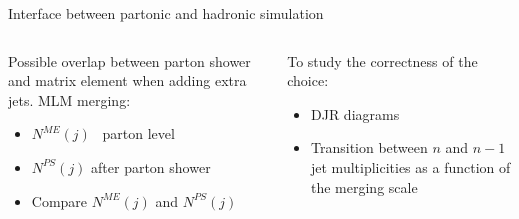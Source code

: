 \begin{frame}{Interface between partonic and hadronic simulation}
\vspace{-.2cm}
\begin{columns}
\begin{column}{.50\textwidth}
  \begin{block}{}\tiny
    Possible overlap between parton shower and matrix element when adding extra jets. MLM merging:
    \begin{itemize}
    \item $N^{ME}(j)$ \MVAt~parton level
    \item $N^{PS}(j)$ after parton shower
    \item Compare $N^{ME}(j)$ and $N^{PS}(j)$
    \end{itemize}
  \end{block}
\end{column}
\begin{column}{.50\textwidth}
  \begin{block}{}\tiny
    To study the correctness of the choice:
    \begin{itemize}
    \item DJR diagrams
    \item Transition between $n$ and $n-1$ jet multiplicities as a function of the merging scale
    \end{itemize}
  \end{block}
\end{column}
\end{columns}


\end{frame}

